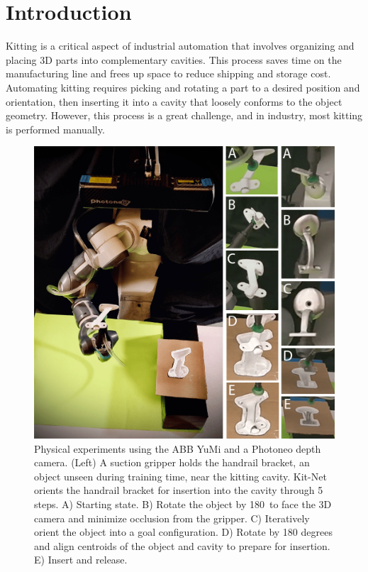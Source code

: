 \section{Introduction}
\label{sec:introduction}
Kitting is a critical aspect of industrial automation that involves organizing and placing 3D parts into complementary cavities. This process saves time on the manufacturing line and frees up space to reduce shipping and storage cost. Automating kitting requires picking and rotating a part to a desired position and orientation, then inserting it into a cavity that loosely conforms to the object geometry. However, this process is a great challenge, and in industry, most kitting %
is performed manually.

\begin{figure}[t]
  \centering
  \includegraphics[width=\columnwidth,trim=0 0 187 0, clip]{figures/Fig1_Final.png}
  \caption{Physical experiments using the ABB YuMi and a Photoneo depth camera. (Left) A suction gripper holds the handrail bracket, an object unseen during training time,
  near the kitting cavity. %
  Kit-Net orients the handrail bracket
  for insertion into the cavity through 5 steps. A) Starting state. B) Rotate the object by 180\degree~to face the 3D camera and minimize occlusion from the gripper. C) Iteratively orient the object into a goal configuration. %
  D) Rotate by 180 degrees and align centroids of the object and cavity to prepare for insertion. E) Insert and release.}
  \label{fig:splash}
\end{figure}

